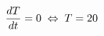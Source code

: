 \documentclass[preview]{standalone}
\begin{document}
\begin{align*}
\special{dvisvgm:raw <g id='unique000'>}\frac{dT}{dt} = 0 \;\Leftrightarrow\; T = 20\special{dvisvgm:raw </g>}
\end{align*}
\end{document}
